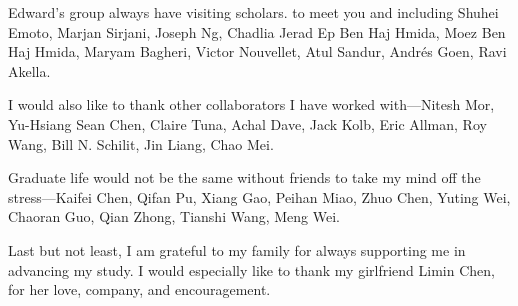\documentclass[thesis.tex]{subfiles}
\begin{document}
\begin{acknowledgements}
  Edward's group always have visiting scholars. to meet you and including Shuhei
  Emoto, Marjan Sirjani, Joseph Ng, Chadlia Jerad Ep Ben Haj Hmida, Moez Ben Haj
  Hmida, Maryam Bagheri, Victor Nouvellet, Atul Sandur, Andr\'es Goen, Ravi
  Akella.

  I would also like to thank other collaborators I have worked with---Nitesh
  Mor, Yu-Hsiang Sean Chen, Claire Tuna, Achal Dave, Jack Kolb, Eric Allman, Roy
  Wang, Bill N. Schilit, Jin Liang, Chao Mei.

  Graduate life would not be the same without friends to take my mind off the
  stress---Kaifei Chen, Qifan Pu, Xiang Gao, Peihan Miao, Zhuo Chen, Yuting Wei,
  Chaoran Guo, Qian Zhong, Tianshi Wang, Meng Wei.

  Last but not least, I am grateful to my family for always supporting me in
  advancing my study.  I would especially like to thank my girlfriend Limin
  Chen, for her love, company, and encouragement.

\end{acknowledgements}
\end{document}
